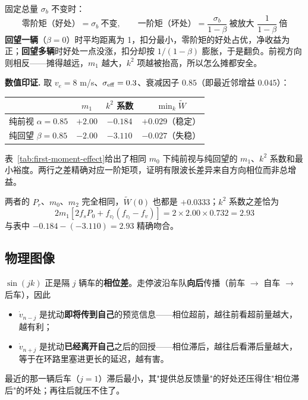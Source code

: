\documentclass[11pt,a4paper,openany]{book}
\numberwithin{equation}{chapter}
\numberwithin{figure}{chapter}
\numberwithin{table}{chapter}
\newcommand{\tabletext}[2]{%
  \par\smallskip\noindent
  表~\ref{#1}给出了#2
  \par\smallskip
}
\begin{document}
\begin{tcolorbox}[notebox,title=\textbf{这就回答了"为什么回望一辆行、多辆不行"}]
固定总量 $\sigma_b$ 不变时：
\[
\text{零阶矩（好处）} = \sigma_b \ \text{不变},
\qquad
\text{一阶矩（坏处）} = \frac{\sigma_b}{1-\beta}\ \text{被放大 } \frac{1}{1-\beta}\ \text{倍}
\]
\textbf{回望一辆}（$\beta=0$）时平均距离为 1，扣分最小，零阶矩的好处占优，净收益为正；\textbf{回望多辆}时好处一点没涨，扣分却按 $1/(1-\beta)$ 膨胀，于是翻负。前视方向则相反——摊得越远，$m_1$ 越大，$k^2$ 项越被抬高，所以怎么摊都安全。
\end{tcolorbox}

\textbf{数值印证.} 取 $v_e=8$ m/s、$\sigma_{\rm eff}=0.3$、衰减因子 $0.85$（即最近邻增益 $0.045$）：

\begin{center}
\label{tab:first-moment-effect}
\begin{tabular}{lccc}
\toprule
& $m_1$ & $k^2$ 系数 & $\min_k\widetilde W$ \\
\midrule
纯前视 $\alpha=0.85$ & $+2.00$ & $-0.184$ & $+0.029$（稳定）\\
纯回望 $\beta=0.85$  & $-2.00$ & $-3.110$ & $-0.027$（失稳）\\
\bottomrule
\end{tabular}
\end{center}
\tabletext{tab:first-moment-effect}{相同 $m_0$ 下纯前视与纯回望的 $m_1$、$k^2$ 系数和最小裕度。两行之差精确对应一阶矩项，证明有限波长差异来自方向相位而非总增益。}

两者的 $P_r$、$m_0$、$m_2$ 完全相同，$\widetilde W(0)$ 也都是 $+0.0333$；$k^2$ 系数之差恰为
\begin{equation}
2m_1\left[2f_sP_0+f_{v_l}\left(f_{v_l}-f_v\right)\right] = 2\times2.00\times0.732 = 2.93
\end{equation}
与表中 $-0.184-(-3.110)=2.93$ 精确吻合。

\subsection{物理图像}

$\sin(jk)$ 正是隔 $j$ 辆车的\textbf{相位差}。走停波沿车队\textbf{向后}传播（前车 $\to$ 自车 $\to$ 后车），因此
\begin{itemize}[leftmargin=1.4em,itemsep=3pt]
\item $\dot v_{n-j}$ 是扰动\textbf{即将传到自己}的预览信息——相位超前，越往前看超前量越大，越有利；
\item $\dot v_{n+j}$ 是扰动\textbf{已经离开自己}之后的回授——相位滞后，越往后看滞后量越大，等于在环路里塞进更长的延迟，越有害。
\end{itemize}
最近的那一辆后车（$j=1$）滞后最小，其"提供总反馈量"的好处还压得住"相位滞后"的坏处；再往后就压不住了。
\end{document}
